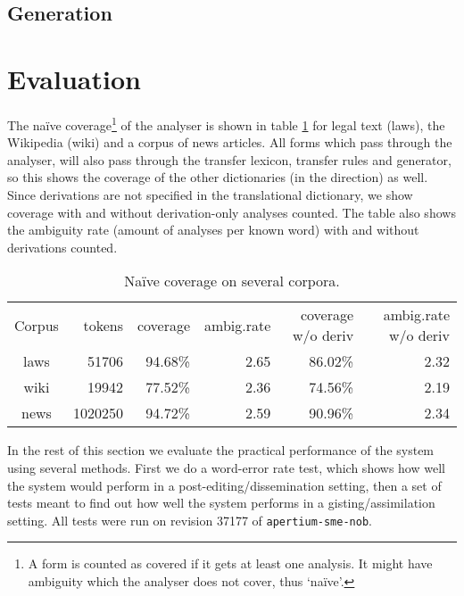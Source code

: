 \subsection{Generation}

\section{Evaluation}
\label{sec:eval}
The naïve coverage\footnote{A form is counted as covered if it gets at
  least one analysis. It might have ambiguity which the analyser does
  not cover, thus `naïve'.} of the analyser is shown in table
\ref{table:cov} for legal text (laws), the \sme Wikipedia (wiki) and a
corpus of \sme news articles. All forms which pass through the
analyser, will also pass through the transfer lexicon, transfer rules
and generator, so this shows the coverage of the other dictionaries
(in the \smenob direction) as well. Since derivations are not
specified in the translational dictionary, we show coverage with and
without derivation-only analyses counted. The table also shows the
ambiguity rate (amount of analyses per known word) with and without
derivations counted.

\begin{table}
  \begin{center}
  \begin{tabular}{crrrrr}
   Corpus     & tokens   & coverage & ambig.rate  & coverage w/o deriv & ambig.rate w/o deriv \\
   laws       &  51706   & 94.68\%  & 2.65        & 86.02\%            & 2.32 \\
   wiki       & 19942    & 77.52\%  & 2.36        & 74.56\%            & 2.19 \\
   news       & 1020250  & 94.72\%  & 2.59        & 90.96\%            & 2.34 \\
  \end{tabular}
    \caption{Naïve coverage on several corpora.}
    \label{table:cov}
  \end{center}
\end{table}
In the rest of this section we evaluate the practical performance of
the system using several methods. First we do a word-error rate test,
which shows how well the system would perform in a
post-editing/dissemination setting, then a set of tests meant to find
out how well the system performs in a gisting/assimilation setting.
All tests were run on revision 37177 of \texttt{apertium-sme-nob}.



